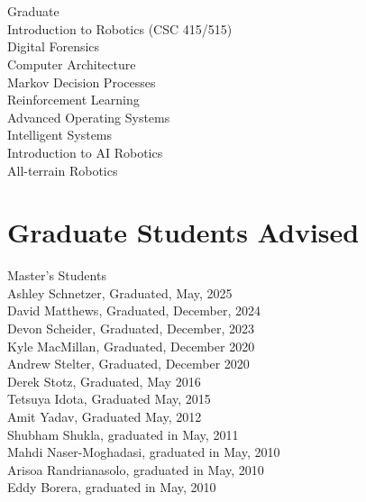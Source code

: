 \documentclass[12pt,letter]{resume}
\begin{document}
\section{}{Graduate}
{\\
  \hspace*{1em} Introduction to Robotics (CSC 415/515)\\
\hspace*{1em} Digital Forensics\\
\hspace*{1em} Computer Architecture\\
\hspace*{1em} Markov Decision Processes\\
\hspace*{1em} Reinforcement Learning\\
\hspace*{1em} Advanced Operating Systems\\
\hspace*{1em} Intelligent Systems\\
\hspace*{1em} Introduction to AI Robotics\\
\hspace*{1em} All-terrain Robotics
}


\section{Graduate Students Advised}{Master's Students}
        {\\
          Ashley Schnetzer, Graduated, May, 2025\\
          David Matthews, Graduated, December, 2024\\
          Devon Scheider, Graduated, December, 2023\\
  Kyle MacMillan, Graduated, December 2020\\
  Andrew Stelter, Graduated, December 2020\\
  Derek Stotz, Graduated, May 2016\\
  Tetsuya Idota, Graduated May, 2015\\
  Amit Yadav, Graduated May, 2012\\
  Shubham Shukla, graduated in May, 2011\\
  Mahdi Naser-Moghadasi, graduated in May, 2010\\
  Arisoa Randrianasolo, graduated in May, 2010\\
  Eddy Borera, graduated in  May, 2010\\
          }
\end{document}
